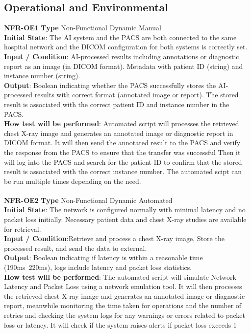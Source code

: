 \documentclass[12pt, titlepage]{article}
\begin{document}
\subsection{Operational and Environmental}
\textbf{NFR-OE1} \textbf{Type} Non-Functional Dynamic Manual\\
        \indent \textbf{Initial State}: The AI system and the PACS are both connected to the same hospital network and the DICOM configuration  for both systems is correctly set.\\
        \indent \textbf{Input / Condition}: AI-processed results including annotations or diagnostic report as an image (in DICOM format). Metadata with patient ID (string) and instance number (string).\\
        \indent \textbf{Output}: Boolean indicating whether the PACS successfully stores the AI-processed results with correct format (annotated image or report). The stored result is associated with the correct patient ID and instance number in the PACS.\\
        \indent \textbf{How test will be performed}: Automated script will processes the retrieved chest X-ray image and generates an annotated image or diagnostic report in DICOM format. It will then send the annotated result to the PACS and verify the response from the PACS to ensure that the transfer was successful Then it will log into the PACS and search for the patient ID to confirm that the stored result is associated with the correct instance number. The automated scipt can be run multiple times depending on the need. \\
        \\
\textbf{NFR-OE2} \textbf{Type} Non-Functional Dynamic Automated\\
        \indent \textbf{Initial State}: The network is configured normally with minimal latency and no packet loss initially. Necessary patient data and chest X-ray studies are available for retrieval.\\
        \indent \textbf{Input / Condition}:Retrieve and process a chest X-ray image, Store the processed result, and send the data to external.\\
        \indent \textbf{Output}: Boolean indicating if latency is within a reasonable time (190ms~220ms), logs include latency and packet loss statistics.\\
        \indent \textbf{How test will be performed}: The automated script will simulate Network Latency and Packet Loss using a network emulation tool. It will then processes the retrieved chest X-ray image and generates an annotated image or diagnostic report, meanwhile monitoring the time taken for operations and the number of retries and checking the system logs for any warnings or errors related to packet loss or latency. It will check if the system raises alerts if packet loss exceeds 1%
        \\
        \\
\end{document}
